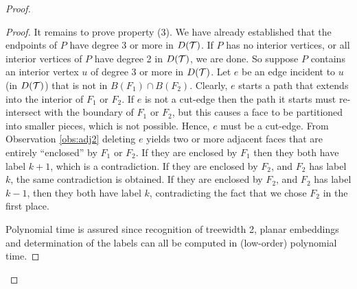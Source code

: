 \begin{proof}
\begin{proof}
It remains to prove property (3). We have already established that the endpoints of $P$ have degree 3 or more in $D({\mathcal T})$. If $P$ has no interior vertices, or all interior vertices of $P$ have degree 2 in $D({\mathcal T})$, we are done. So suppose $P$ contains an interior vertex $u$ of degree 3 or more in $D({\mathcal T})$. Let $e$ be an edge incident to $u$ (in $D({\mathcal T})$) that is not in $B(F_1) \cap B(F_2)$. Clearly, $e$ starts a path that extends into the interior of $F_1$ or $F_2$. If $e$ is not a cut-edge then the path it starts must re-intersect with the boundary of $F_1$ or $F_2$, but this causes a face to be partitioned into smaller pieces, which is not possible. Hence, $e$ must be a cut-edge. From Observation \ref{obs:adj2} deleting $e$ yields two or more adjacent faces that are entirely ``enclosed'' by $F_1$ or $F_2$. If they are enclosed by $F_1$ then they both have label $k+1$, which is a contradiction. If they are enclosed by $F_2$, and $F_2$ has label $k$, the same contradiction is obtained. If they are enclosed by $F_2$, and $F_2$ has label $k-1$, then they both have label $k$, contradicting the fact that we chose $F_2$ in the first place.

Polynomial time is assured since recognition of treewidth 2, planar embeddings and determination of the labels can all be computed
in (low-order) polynomial time.

\end{proof}












\end{proof}
